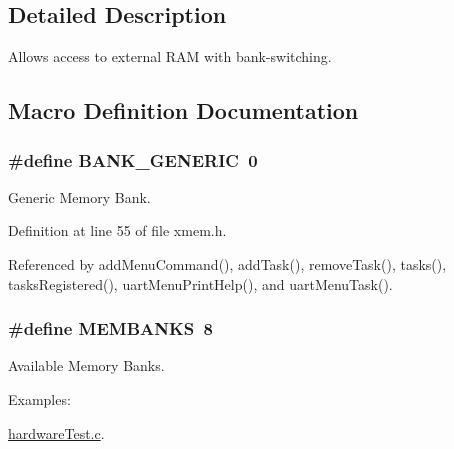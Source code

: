 \subsection{Detailed Description}
Allows access to external R\-A\-M with bank-\/switching. 

\subsection{Macro Definition Documentation}
\hypertarget{group__xmem_ga6b1167d0078b33af8ec17ededaebe0cb}{
\subsubsection[{B\-A\-N\-K\-\_\-\-G\-E\-N\-E\-R\-I\-C}]{\setlength{\rightskip}{0pt plus 5cm}\#define B\-A\-N\-K\-\_\-\-G\-E\-N\-E\-R\-I\-C~0}}\label{group__xmem_ga6b1167d0078b33af8ec17ededaebe0cb}


Generic Memory Bank. 



Definition at line 55 of file xmem.\-h.



Referenced by add\-Menu\-Command(), add\-Task(), remove\-Task(), tasks(), tasks\-Registered(), uart\-Menu\-Print\-Help(), and uart\-Menu\-Task().

\hypertarget{group__xmem_ga1ed280cb3dd0a4a03aeda6aaccc180d3}{
\subsubsection[{M\-E\-M\-B\-A\-N\-K\-S}]{\setlength{\rightskip}{0pt plus 5cm}\#define M\-E\-M\-B\-A\-N\-K\-S~8}}\label{group__xmem_ga1ed280cb3dd0a4a03aeda6aaccc180d3}


Available Memory Banks. 

\begin{Desc}
\item[Examples\-: ]\par
\hyperlink{hardware_test_8c-example}{hardware\-Test.\-c}.\end{Desc}


